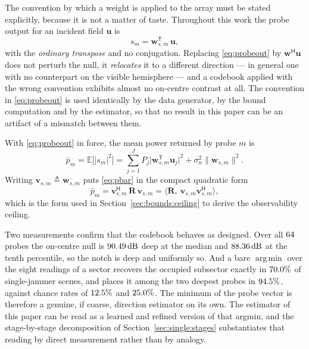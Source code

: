 \documentclass[journal]{IEEEtran}
\newcommand{\Rt}{\mathbf{R}}
\newcommand{\uv}{\mathbf{u}}
\newcommand{\wv}{\mathbf{w}}
\newcommand{\Herm}{\mathsf{H}}
\newcommand{\Tr}{\mathsf{T}}
\newcommand{\dB}{\,\mathrm{dB}}
\DeclareMathOperator*{\argmin}{arg\,min}
\begin{document}
The convention by which a weight is applied to the array must be stated
explicitly, because it is not a matter of taste. Throughout this work the
probe output for an incident field $\uv$ is
\begin{equation}
s_m = \wv_{s,m}^{\Tr}\, \uv ,
\label{eq:probeout}
\end{equation}
with the \emph{ordinary transpose} and no conjugation. Replacing
\eqref{eq:probeout} by $\wv^{\Herm}\uv$ does not perturb the null, it
\emph{relocates} it to a different direction --- in general one with no
counterpart on the visible hemisphere --- and a codebook applied with the wrong
convention exhibits almost no on-centre contrast at all. The convention in
\eqref{eq:probeout} is used identically by the data generator, by the bound
computation and by the estimator, so that no result in this paper can be an
artifact of a mismatch between them.

With \eqref{eq:probeout} in force, the mean power returned by probe $m$ is
\begin{equation}
\bar{p}_m
= \mathbb{E}\big[|s_m|^2\big]
= \sum_{j=1}^{J} P_j \big|\wv_{s,m}^{\Tr}\uv_j\big|^2
  + \sigma_n^2 \|\wv_{s,m}\|^2 .
\label{eq:pbar}
\end{equation}
Writing $\mathbf{v}_{s,m} \triangleq \overline{\wv_{s,m}}$ puts
\eqref{eq:pbar} in the compact quadratic form
\begin{equation}
\bar{p}_m = \mathbf{v}_{s,m}^{\Herm}\, \Rt\, \mathbf{v}_{s,m}
          = \big\langle \Rt,\ \mathbf{v}_{s,m}\mathbf{v}_{s,m}^{\Herm}
            \big\rangle ,
\label{eq:pbarlinear}
\end{equation}
which is the form used in Section~\ref{sec:bounds:ceiling} to derive the
observability ceiling.

Two measurements confirm that the codebook behaves as designed. Over all $64$
probes the on-centre null is $\nullDepthMed\dB$ deep at the median and $\nullDepthPten\dB$ at
the tenth percentile, so the notch is deep and uniformly so. And a bare
$\argmin$ over the eight readings of a sector recovers the occupied subsector
exactly in $70.0\%$ of single-jammer scenes, and places it among the two
deepest probes in $94.5\%$, against chance rates of $12.5\%$ and $25.0\%$. The
minimum of the probe vector is therefore a genuine, if coarse, direction
estimator on its own. The estimator of this paper can be read as a learned and
refined version of that argmin, and the stage-by-stage decomposition of
Section~\ref{sec:single:stages} substantiates that reading by direct
measurement rather than by analogy.
\end{document}
